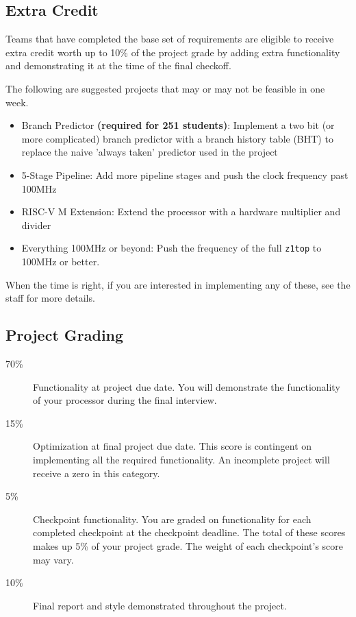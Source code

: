 \documentclass[11pt]{article}
\begin{document}
\subsection{Extra Credit}
\label{extra_credit}
Teams that have completed the base set of requirements are eligible to receive extra credit worth up to 10\% of the project grade by adding extra functionality and demonstrating it at the time of the final checkoff.

The following are suggested projects that may or may not be feasible in one week.
\begin{itemize}
  \item Branch Predictor \textbf{(required for 251 students)}: Implement a two bit (or more complicated) branch predictor with a branch history table (BHT) to replace the naive 'always taken' predictor used in the project
  \item 5-Stage Pipeline: Add more pipeline stages and push the clock frequency past 100MHz
  \item RISC-V M Extension: Extend the processor with a hardware multiplier and divider
  \item Everything 100MHz or beyond: Push the frequency of the full \verb|z1top| to 100MHz or better.
\end{itemize}

When the time is right, if you are interested in implementing any of these, see the staff for more details.

\subsection{Project Grading}
\label{deadlinegrading}

\begin{description}
  \item[70\%] {Functionality} at project due date. You will demonstrate the functionality of your processor during the final interview.
  \item[15\%] {Optimization} at final project due date. This score is contingent on implementing all the required functionality. An incomplete project will receive a zero in this category.
  \item[5\%] {Checkpoint} functionality. You are graded on functionality for each completed checkpoint at the checkpoint deadline. The total of these scores makes up 5\% of your project grade. The weight of each checkpoint's score may vary.
  \item[10\%] {Final report} and {style} demonstrated throughout the project.
\end{description}
\end{document}
